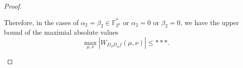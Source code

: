 \documentclass{article}
\newcommand{\F}{\mathbb{F}}
\newcommand{\0}{\textbf{0}}
\newcommand{\1}{\textbf{1}}
\newcommand{\TRACE}{\operatorname{Tr}_1^k}
\theoremstyle{plain}
\theoremstyle{nonumberplain}
\begin{document}
\begin{proof}
\begin{enumerate}[label=\textbf{Case \arabic*}]
    Therefore, in the cases of $ \alpha_2=\beta_2\in\F_{2^k}^* $ or $ \alpha_2=0 $ or $ \beta_2=0 $, 
    we have the upper bound of the maximial absolute values 
    \[\max_{\mu,\nu}|W_{D_{\beta}D_{\alpha}f}(\mu,\nu)|\le ***.\]

    







\end{enumerate}
\end{proof}
\end{document}
